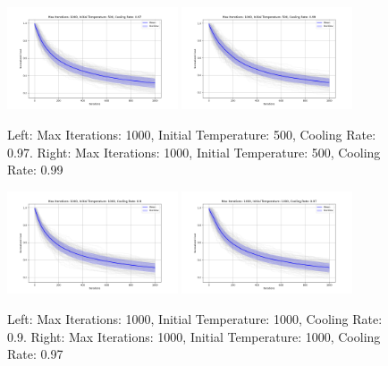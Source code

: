 \documentclass{article}
\begin{document}
    \begin{figure}[H]
        \centering
        \includegraphics[width=0.45\textwidth]{simulated_annealing/appendix/max_iter_1000_init_temp_500_cooling_rate_0.97.png}
        \includegraphics[width=0.45\textwidth]{simulated_annealing/appendix/max_iter_1000_init_temp_500_cooling_rate_0.99.png}
        \caption{Left: Max Iterations: 1000, Initial Temperature: 500, Cooling Rate: 0.97. Right: Max Iterations: 1000, Initial Temperature: 500, Cooling Rate: 0.99}
        \label{fig:sa_1000_500_0.97_1000_500_0.99}
    \end{figure}

    \begin{figure}[H]
        \centering
        \includegraphics[width=0.45\textwidth]{simulated_annealing/appendix/max_iter_1000_init_temp_1000_cooling_rate_0.9.png}
        \includegraphics[width=0.45\textwidth]{simulated_annealing/appendix/max_iter_1000_init_temp_1000_cooling_rate_0.97.png}
        \caption{Left: Max Iterations: 1000, Initial Temperature: 1000, Cooling Rate: 0.9. Right: Max Iterations: 1000, Initial Temperature: 1000, Cooling Rate: 0.97}
        \label{fig:sa_1000_1000_0.9_1000_1000_0.97}
    \end{figure}
\end{document}
